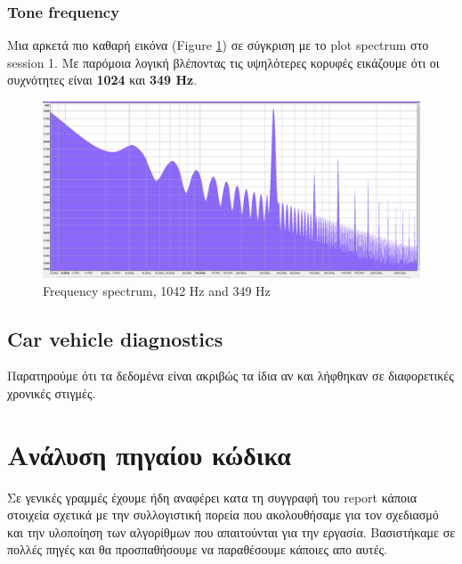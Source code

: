 \documentclass[hidelinks, 12pt, a4paper]{article}
\begin{document}
\subsubsection{Tone frequency}

Μια αρκετά πιο καθαρή εικόνα (Figure \ref{spectrum2}) σε σύγκριση με το plot spectrum στο session 1. Με παρόμοια λογική βλέποντας τις υψηλότερες κορυφές εικάζουμε ότι οι συχνότητες είναι \textbf{1024} και \textbf{349 Hz}.

\begin{figure}[h!]
\centering
	\includegraphics[height=.3\textheight, width=\textwidth]{assets/session2/spectrum.png}
    \caption{Frequency spectrum, 1042 Hz and 349 Hz}
    \label{spectrum2}
\end{figure}

\subsection{Car vehicle diagnostics}

Παρατηρούμε ότι τα δεδομένα είναι ακριβώς τα ίδια αν και λήφθηκαν σε διαφορετικές χρονικές στιγμές.

\section{Ανάλυση πηγαίου κώδικα}

Σε γενικές γραμμές έχουμε ήδη αναφέρει κατα τη συγγραφή του report κάποια στοιχεία σχετικά με την συλλογιστική πορεία που ακολουθήσαμε για τον σχεδιασμό και την υλοποίηση των αλγορίθμων που απαιτούνται για την εργασία. Βασιστήκαμε σε πολλές πηγές και θα προσπαθήσουμε να παραθέσουμε κάποιες απο αυτές.
\end{document}
